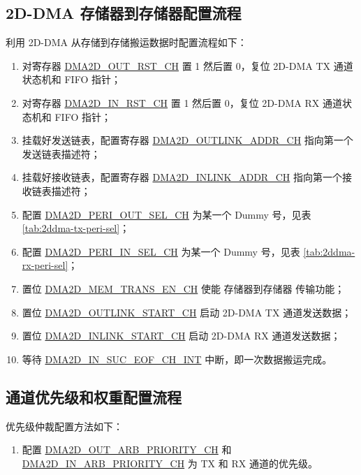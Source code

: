 \documentclass[main\_\_CN.tex]{subfiles}
\begin{document}
\subsection{2D-DMA 存储器到存储器配置流程}
利用 2D-DMA 从存储到存储搬运数据时配置流程如下：
\begin{enumerate}
    \item 对寄存器 \hyperref[fielddesc:DMA2DOUTRSTCHN]{DMA2D\_OUT\_RST\_CH} 置 1 然后置 0，复位 2D-DMA TX 通道状态机和 FIFO 指针；
    \item 对寄存器 \hyperref[fielddesc:DMA2DINRSTCHN]{DMA2D\_IN\_RST\_CH} 置 1 然后置 0，复位 2D-DMA RX 通道状态机和 FIFO 指针；
    \item 挂载好发送链表，配置寄存器 \hyperref[fielddesc:DMA2DOUTLINKADDRCHN]{DMA2D\_OUTLINK\_ADDR\_CH} 指向第一个发送链表描述符；
    \item 挂载好接收链表，配置寄存器 \hyperref[fielddesc:DMA2DINLINKADDRCHN]{DMA2D\_INLINK\_ADDR\_CH} 指向第一个接收链表描述符；
    \item 配置 \hyperref[fielddesc:DMA2DOUTPERISELCHN]{DMA2D\_PERI\_OUT\_SEL\_CH} 为某一个 Dummy 号，见表 \ref{tab:2ddma-tx-peri-sel}；
    \item 配置 \hyperref[fielddesc:DMA2DINPERISELCHN]{DMA2D\_PERI\_IN\_SEL\_CH} 为某一个 Dummy 号，见表 \ref{tab:2ddma-rx-peri-sel}；
    \item 置位 \hyperref[fielddesc:DMA2DINMEMTRANSENCHN]{DMA2D\_MEM\_TRANS\_EN\_CH} 使能 存储器到存储器 传输功能；
    \item 置位 \hyperref[fielddesc:DMA2DOUTLINKSTARTCHN]{DMA2D\_OUTLINK\_START\_CH} 启动 2D-DMA TX 通道发送数据；
    \item 置位 \hyperref[fielddesc:DMA2DINLINKSTARTCHN]{DMA2D\_INLINK\_START\_CH} 启动 2D-DMA RX 通道发送数据；
    \item 等待 \hyperref[int:DMA2DINSUCEOFINT]{DMA2D\_IN\_SUC\_EOF\_CH\_INT} 中断，即一次数据搬运完成。
\end{enumerate}

\subsection{通道优先级和权重配置流程}

优先级仲裁配置方法如下：
\begin{enumerate}
\item  配置 \hyperref[fielddesc:DMA2DOUTARBPRIORITYCHN]{DMA2D\_OUT\_ARB\_PRIORITY\_CH} 和 \hyperref[fielddesc:DMA2DINARBPRIORITYCHN]{DMA2D\_IN\_ARB\_PRIORITY\_CH} 为 TX 和 RX 通道的优先级。
\end{enumerate}
\end{document}
